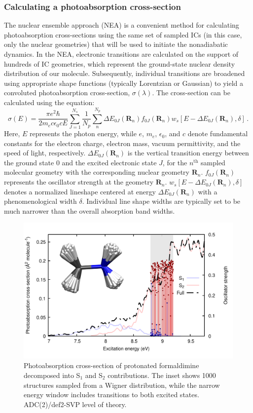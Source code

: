\documentclass[9pt,bestpractices]{livecoms}
\begin{document}
\subsubsection{Calculating a photoabsorption cross-section}
\label{sec:photoabscrosssec}
The nuclear ensemble approach (NEA)\cite{crespo2014spectrum,crespo2018recent} is a convenient method for calculating photoabsorption cross-sections using the same set of sampled ICs (in this case, only the nuclear geometries) that will be used to initiate the nonadiabatic dynamics. In the NEA, electronic transitions are calculated on the support of hundreds of IC geometries, which represent the ground-state nuclear density distribution of our molecule. Subsequently, individual transitions are broadened using appropriate shape functions (typically Lorentzian or Gaussian) to yield a convoluted photoabsorption cross-section, $\sigma (\lambda)$.\cite{crespo2014spectrum,crespo2018recent} The cross-section can be calculated using the equation:
\begin{equation}
\sigma(E)=\frac{\pi e^2 \hbar}{2m_e c \epsilon_0 c E} \sum_{J=1}^{N_s} \frac{1}{N_p} \sum_n^{N_p}\Delta E_{0J}(\mathbf{R}_n)f_{0J}(\mathbf{R}_n)w_s[E-\Delta E_{0J}(\mathbf{R}_n),\delta] \, .
\end{equation}
Here, $E$ represents the photon energy, while $e$, $m_e$, $\epsilon_0$, and $c$ denote fundamental constants for the electron charge, electron mass, vacuum permittivity, and the speed of light, respectively. $\Delta E_{0J}(\mathbf{R}_n)$ is the vertical transition energy between the ground state $0$ and the excited electronic state $J$, for the $n^\text{th}$ sampled molecular geometry with the corresponding nuclear geometry $\mathbf{R}_n$. $f_{0J}(\mathbf{R}_n)$ represents the oscillator strength at the geometry $\mathbf{R}_n$. $w_s[E-\Delta E_{0J}(\mathbf{R}_n),\delta]$ denotes a normalized lineshape centered at energy $\Delta E_{0J}(\mathbf{R}_n)$ with a phenomenological width $\delta$. Individual line shape widths are typically set to be much narrower than the overall absorption band widths.


\begin{figure}[h!]
    \centering
    \includegraphics[width=0.7\linewidth]{./figures/IC-sampling.png}
    \caption{Photoabsorption cross-section of protonated formaldimine decomposed into S$_1$ and S$_2$ contributions. The inset shows 1000 structures sampled from a Wigner distribution, while the narrow energy window includes transitions to both excited states. ADC(2)/def2-SVP level of theory.}
    \label{fig:ic_sampling}
\end{figure}
\end{document}
